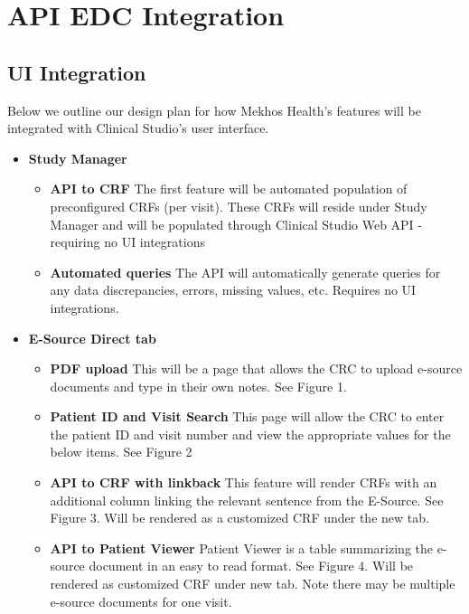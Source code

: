 \documentclass[12pt]{article}
\begin{document}
\section{API EDC Integration}

\subsection{UI Integration}
Below we outline our design plan for how Mekhos Health's features will be integrated with Clinical Studio's user interface. 
\\
\begin{itemize}
\item \textbf{Study Manager}
\begin{itemize}
\item \textbf{API to CRF} The first feature will be automated population of preconfigured CRFs (per visit). These CRFs will reside under Study Manager and will be populated through Clinical Studio Web API - requiring no UI integrations

\item \textbf{Automated queries} The API will automatically generate queries for any data discrepancies, errors, missing values, etc. Requires no UI integrations.
\end{itemize}

\item \textbf{E-Source Direct tab}
\begin{itemize}

\item \textbf{PDF upload} This will be a page that allows the CRC to upload e-source documents and type in their own notes. See Figure 1.

\item \textbf{Patient ID and Visit Search} This page will allow the CRC to enter the patient ID and visit number and view the appropriate values for the below items. See Figure 2

\item \textbf{API to CRF with linkback} This feature will render CRFs with an additional column linking the relevant sentence from the E-Source. See Figure 3. Will be rendered as a customized CRF under the new tab.

\item \textbf{API to Patient Viewer} Patient Viewer is a table summarizing the e-source document in an easy to read format. See Figure 4. Will be rendered as customized CRF under new tab. Note there may be multiple e-source documents for one visit.


\end{itemize}
\end{itemize}
\end{document}
